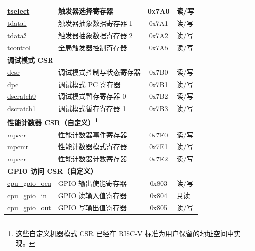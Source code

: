 \begin{longtable}{ | p{4.0cm} | p{8.4cm} | c | l | }
\hyperref[regdesc:TSELECT]{tselect} & 触发器选择寄存器 & 0x7A0 & 读/写 \\\hline
\hyperref[regdesc:TDATA1]{tdata1} & 触发器抽象数据寄存器 1  & 0x7A1 & 读/写 \\\hline
\hyperref[regdesc:TDATA2]{tdata2} & 触发器抽象数据寄存器 2 & 0x7A2 & 读/写 \\\hline
\hyperref[regdesc:TCONTROL]{tcontrol} & 全局触发器控制寄存器 & 0x7A5 & 读/写 \\\hline
\multicolumn{4}{|l|}{\textbf{调试模式 CSR}} \\\hline
\hyperref[regdesc:DCSR]{dcsr} & 调试模式控制与状态寄存器  & 0x7B0 & 读/写 \\\hline
\hyperref[regdesc:DPC]{dpc} & 调试模式 PC 寄存器 & 0x7B1 & 读/写 \\\hline
\hyperref[regdesc:DSCRATCH0]{dscratch0} & 调试模式暂存寄存器 0 & 0x7B2 & 读/写 \\\hline
\hyperref[regdesc:DSCRATCH1]{dscratch1} & 调试模式暂存寄存器 1 & 0x7B3 & 读/写 \\\hline
\multicolumn{4}{|l|}{\textbf{性能计数器 CSR（自定义）\footnote{这些自定义机器模式 CSR 已经在 RISC-V 标准为用户保留的地址空间中实现。}}} \\\hline
\hyperref[regdesc:MPCER]{mpcer} & 性能计数器事件寄存器 & 0x7E0 & 读/写 \\\hline
\hyperref[regdesc:MPCMR]{mpcmr} & 性能计数器模式寄存器 & 0x7E1 & 读/写 \\\hline
\hyperref[regdesc:MPCCR]{mpccr} & 性能计数器计数寄存器 & 0x7E2 & 读/写 \\\hline
\multicolumn{4}{|l|}{\textbf{GPIO 访问 CSR（自定义）}} \\\hline
\hyperref[regdesc:GPIO_OEN]{cpu\_gpio\_oen} & GPIO 输出使能寄存器 & 0x803 & 读/写  \\\hline
\hyperref[regdesc:GPIO_IN]{cpu\_gpio\_in} & GPIO 读输入值寄存器 & 0x804 & 只读 \\\hline
\hyperref[regdesc:GPIO_OUT]{cpu\_gpio\_out} & GPIO 写输出值寄存器 & 0x805 & 读/写  \\\hline
\end{longtable}
